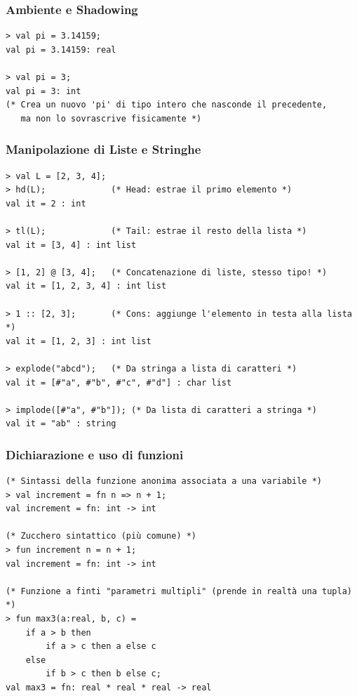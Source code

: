 \documentclass[12pt, a4paper]{article}
\begin{document}
\subsubsection{Ambiente e Shadowing}
\begin{verbatim}
> val pi = 3.14159;
val pi = 3.14159: real

> val pi = 3; 
val pi = 3: int
(* Crea un nuovo 'pi' di tipo intero che nasconde il precedente, 
   ma non lo sovrascrive fisicamente *)
\end{verbatim}

\subsubsection{Manipolazione di Liste e Stringhe}
\begin{verbatim}
> val L = [2, 3, 4];
> hd(L);             (* Head: estrae il primo elemento *)
val it = 2 : int

> tl(L);             (* Tail: estrae il resto della lista *)
val it = [3, 4] : int list

> [1, 2] @ [3, 4];   (* Concatenazione di liste, stesso tipo! *)
val it = [1, 2, 3, 4] : int list

> 1 :: [2, 3];       (* Cons: aggiunge l'elemento in testa alla lista *)
val it = [1, 2, 3] : int list

> explode("abcd");   (* Da stringa a lista di caratteri *)
val it = [#"a", #"b", #"c", #"d"] : char list

> implode([#"a", #"b"]); (* Da lista di caratteri a stringa *)
val it = "ab" : string
\end{verbatim}

\subsubsection{Dichiarazione e uso di funzioni}
\begin{verbatim}
(* Sintassi della funzione anonima associata a una variabile *)
> val increment = fn n => n + 1;
val increment = fn: int -> int

(* Zucchero sintattico (più comune) *)
> fun increment n = n + 1;
val increment = fn: int -> int

(* Funzione a finti "parametri multipli" (prende in realtà una tupla) *)
> fun max3(a:real, b, c) = 
    if a > b then 
        if a > c then a else c
    else 
        if b > c then b else c;
val max3 = fn: real * real * real -> real
\end{verbatim}
\end{document}
